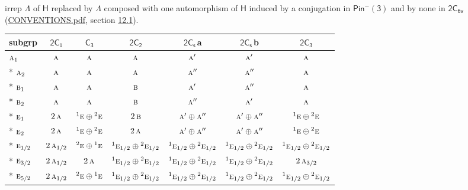 \documentclass[10pt,a4paper]{article}
\numberwithin{equation}{section}
\newcommand{\grp}[1]{\mathsf{#1}}
\newcommand{\irr}[1]{\text{\normalfont\scshape #1}}
\newcommand{\conjpair}[1]{{}^{#1}}
\newcommand{\clsletter}[1]{\,{\scriptsize\color{black!55}#1}}
\begin{document}
irrep $\Lambda$ of $\grp{H}$ replaced by $\Lambda$ composed with one automorphism of $\grp{H}$ induced by a conjugation in \href{Pinminus3.pdf}{$\grp{Pin^{-}(3)}$} and by none in $\grp{2C_{6v}}$ (\href{../../CONVENTIONS.pdf}{CONVENTIONS.pdf}, section \href{../../../rotation/CONVENTIONS.pdf\#conv.12.1}{12.1}).
{\small\begin{longtable}{@{}lcccccc@{}}\toprule
subgrp & \href{2C1.pdf}{$\grp{2C_{1}}$} & \href{C3.pdf}{$\grp{C_{3}}$} & \href{2C2.pdf}{$\grp{2C_{2}}$} & \href{2C1v.pdf}{$\grp{2C_{s}}$}\clsletter{a} & \href{2C1v.pdf}{$\grp{2C_{s}}$}\clsletter{b} & \href{2C3.pdf}{$\grp{2C_{3}}$}\\\midrule\endhead
\bottomrule\endfoot\endlastfoot
$\irr{a}_{1}$ & $\irr{a}$ & $\irr{a}$ & $\irr{a}$ & $\irr{a}'$ & $\irr{a}'$ & $\irr{a}$\\*
$\irr{a}_{2}$ & $\irr{a}$ & $\irr{a}$ & $\irr{a}$ & $\irr{a}''$ & $\irr{a}''$ & $\irr{a}$\\*
$\irr{b}_{1}$ & $\irr{a}$ & $\irr{a}$ & $\irr{b}$ & $\irr{a}'$ & $\irr{a}''$ & $\irr{a}$\\*
$\irr{b}_{2}$ & $\irr{a}$ & $\irr{a}$ & $\irr{b}$ & $\irr{a}''$ & $\irr{a}'$ & $\irr{a}$\\*
$\irr{e}_{1}$ & $2\,\irr{a}$ & $\conjpair{1}\irr{e}\oplus \conjpair{2}\irr{e}$ & $2\,\irr{b}$ & $\irr{a}'\oplus \irr{a}''$ & $\irr{a}'\oplus \irr{a}''$ & $\conjpair{1}\irr{e}\oplus \conjpair{2}\irr{e}$\\*
$\irr{e}_{2}$ & $2\,\irr{a}$ & $\conjpair{1}\irr{e}\oplus \conjpair{2}\irr{e}$ & $2\,\irr{a}$ & $\irr{a}'\oplus \irr{a}''$ & $\irr{a}'\oplus \irr{a}''$ & $\conjpair{1}\irr{e}\oplus \conjpair{2}\irr{e}$\\*
$\irr{e}_{1/2}$ & $2\,\irr{a}_{1/2}$ & $\conjpair{2}\irr{e}\oplus \conjpair{1}\irr{e}$ & $\conjpair{1}\irr{e}_{1/2}\oplus \conjpair{2}\irr{e}_{1/2}$ & $\conjpair{1}\irr{e}_{1/2}\oplus \conjpair{2}\irr{e}_{1/2}$ & $\conjpair{1}\irr{e}_{1/2}\oplus \conjpair{2}\irr{e}_{1/2}$ & $\conjpair{1}\irr{e}_{1/2}\oplus \conjpair{2}\irr{e}_{1/2}$\\*
$\irr{e}_{3/2}$ & $2\,\irr{a}_{1/2}$ & $2\,\irr{a}$ & $\conjpair{1}\irr{e}_{1/2}\oplus \conjpair{2}\irr{e}_{1/2}$ & $\conjpair{1}\irr{e}_{1/2}\oplus \conjpair{2}\irr{e}_{1/2}$ & $\conjpair{1}\irr{e}_{1/2}\oplus \conjpair{2}\irr{e}_{1/2}$ & $2\,\irr{a}_{3/2}$\\*
$\irr{e}_{5/2}$ & $2\,\irr{a}_{1/2}$ & $\conjpair{2}\irr{e}\oplus \conjpair{1}\irr{e}$ & $\conjpair{1}\irr{e}_{1/2}\oplus \conjpair{2}\irr{e}_{1/2}$ & $\conjpair{1}\irr{e}_{1/2}\oplus \conjpair{2}\irr{e}_{1/2}$ & $\conjpair{1}\irr{e}_{1/2}\oplus \conjpair{2}\irr{e}_{1/2}$ & $\conjpair{1}\irr{e}_{1/2}\oplus \conjpair{2}\irr{e}_{1/2}$\\
\bottomrule\end{longtable}}
\end{document}

